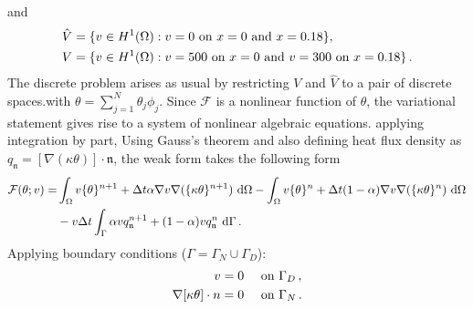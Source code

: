 \documentclass[]{article}
\begin{document}
and
\begin{equation}\label{eq10}
	\begin{aligned}
		\hat{V} &= \{v \in H^1(\Omega) : v = 0 \text{ on } x=0\mbox{ and }x=0.18\}, \\
		V &= \{v \in H^1(\Omega) : v = 500 \text{ on } x=0\text{ and } v = 300\text{ on }x=0.18\}\thinspace.
	\end{aligned}
\end{equation}
The discrete problem arises as usual by restricting $V$ and $\hat{V}$ to a pair of discrete spaces.with $\theta = \sum_{j=1}^N \theta_j \phi_j$. Since $\mathcal{F}$ is a nonlinear function of $\theta$, the variational statement gives rise to a system of nonlinear algebraic equations. applying integration by part, Using Gauss’s theorem and also defining  heat flux density as $q_{\mathfrak{n}} =  [\nabla(\kappa\theta)]\cdot\mathfrak{n}$, the weak form takes the following form
\begin{equation}\label{eq11}
	\begin{aligned}
		\mathcal{F}(\theta; v) =& \int_{\Omega} v \{\theta\}^{n+1} + \Delta t \alpha\nabla v \nabla(\{\kappa \theta\}^{n+1}) \ \mathrm{d} \Omega - \int_{\Omega} v\{\theta\}^{n} + \Delta t (1-\alpha) \nabla v\nabla(\{\kappa \theta\}^{n}) \ \mathrm{d} \Omega \\
		&- v \Delta t \int_{\Gamma}  \alpha v q^{n+1}_{\mathfrak{n}} + (1-\alpha)v q^{n}_{\mathfrak{n}} \ \mathrm{d} \Gamma\thinspace.
	\end{aligned}
\end{equation}
Applying boundary conditions ($\Gamma = \Gamma_N \cup \Gamma_D$):
\begin{equation}\label{eq12}
	\begin{aligned}
		v= 0 \quad &\text{ on } \Gamma_D\thinspace, \\
		\nabla [\kappa\theta] \cdot n = 0 \quad &\text{ on } \Gamma_N \thinspace.
	\end{aligned}
\end{equation}
\end{document}
